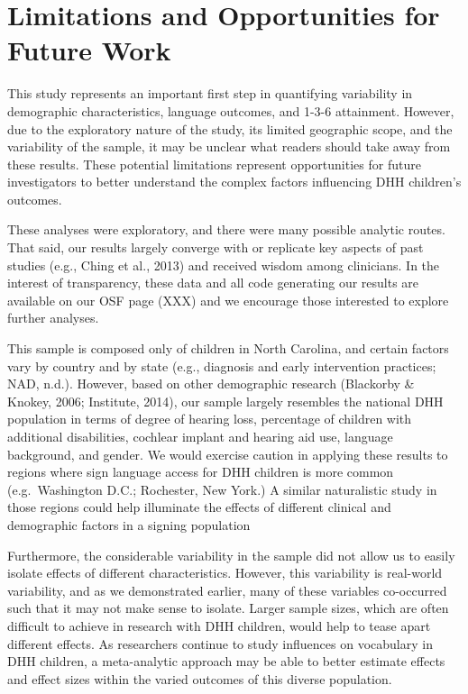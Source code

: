 \documentclass[english,man]{apa6}
\begin{document}
\hypertarget{limitations-and-opportunities-for-future-work}{%
\section{Limitations and Opportunities for Future Work}\label{limitations-and-opportunities-for-future-work}}

This study represents an important first step in quantifying variability in demographic characteristics, language outcomes, and 1-3-6 attainment. However, due to the exploratory nature of the study, its limited geographic scope, and the variability of the sample, it may be unclear what readers should take away from these results. These potential limitations represent opportunities for future investigators to better understand the complex factors influencing DHH children's outcomes.

These analyses were exploratory, and there were many possible analytic routes. That said, our results largely converge with or replicate key aspects of past studies (e.g., Ching et al., 2013) and received wisdom among clinicians. In the interest of transparency, these data and all code generating our results are available on our OSF page (XXX) and we encourage those interested to explore further analyses.

This sample is composed only of children in North Carolina, and certain factors vary by country and by state (e.g., diagnosis and early intervention practices; NAD, n.d.). However, based on other demographic research (Blackorby \& Knokey, 2006; Institute, 2014), our sample largely resembles the national DHH population in terms of degree of hearing loss, percentage of children with additional disabilities, cochlear implant and hearing aid use, language background, and gender. We would exercise caution in applying these results to regions where sign language access for DHH children is more common (e.g.~Washington D.C.; Rochester, New York.) A similar naturalistic study in those regions could help illuminate the effects of different clinical and demographic factors in a signing population

Furthermore, the considerable variability in the sample did not allow us to easily isolate effects of different characteristics. However, this variability is real-world variability, and as we demonstrated earlier, many of these variables co-occurred such that it may not make sense to isolate. Larger sample sizes, which are often difficult to achieve in research with DHH children, would help to tease apart different effects. As researchers continue to study influences on vocabulary in DHH children, a meta-analytic approach may be able to better estimate effects and effect sizes within the varied outcomes of this diverse population.
\end{document}
